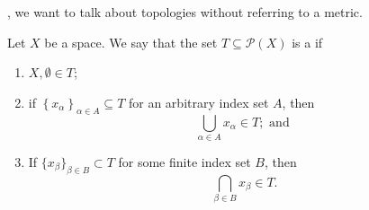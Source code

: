 \documentclass[notoc,notitlepage]{tufte-book}
\begin{document}
, we want to talk about topologies without referring to a metric.

\begin{defn}[Topology]\label{defn:topology}
  Let $X$ be a space. We say that the set $T \subseteq \mathcal{P}(X)$ is a  if
  \begin{enumerate}
    \item $X, \emptyset \in T$;
    \item if $\left\{ x_\alpha \right\}_{\alpha \in A} \subseteq T$ for an arbitrary index set $A$, then
      \begin{equation*}
        \bigcup_{\alpha \in A} x_\alpha \in T; \text{ and }
      \end{equation*}
    \item If $\{ x_\beta \}_{\beta \in B} \subset T$ for some finite index set $B$, then
      \begin{equation*}
        \bigcap_{\beta \in B} x_\beta \in T.
      \end{equation*}
  \end{enumerate}
\end{defn}



\appendix

\backmatter

\pagestyle{plain}

\nobibliography*


\printindex
\end{document}
